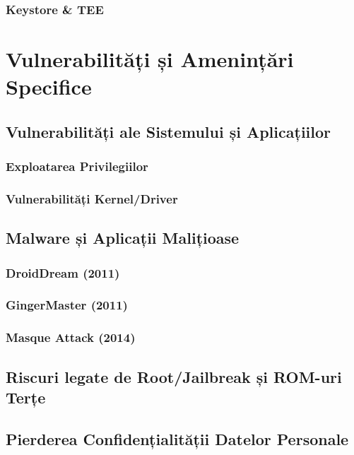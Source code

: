 \documentclass[11pt,a4paper,twocolumn]{article}
\theoremstyle{definition}
\theoremstyle{plain}
\theoremstyle{remark}
\begin{document}
\subsubsection{Keystore \& TEE}

\section{Vulnerabilități și Amenințări Specifice}

\subsection{Vulnerabilități ale Sistemului și Aplicațiilor}

\subsubsection{Exploatarea Privilegiilor}

\subsubsection{Vulnerabilități Kernel/Driver}

\subsection{Malware și Aplicații Malițioase}

\subsubsection{DroidDream (2011)}

\subsubsection{GingerMaster (2011)}

\subsubsection{Masque Attack (2014)}

\subsection{Riscuri legate de Root/Jailbreak și ROM-uri Terțe}

\subsection{Pierderea Confidențialității Datelor Personale}
\end{document}
